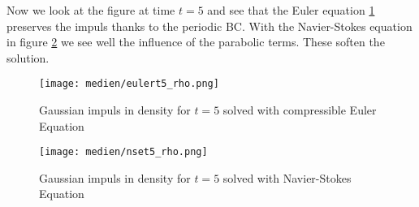 \documentclass[11pt]{scrartcl}
\begin{document}
 Now we look at the figure at time $t = 5$ and see that the Euler equation \ref{gaus_euler_t5} preserves the impuls thanks to the periodic BC. With the Navier-Stokes equation in figure \ref{gaus_nse_t5} we see well the influence of the parabolic terms. These soften the solution.
 
 \begin{figure}[H]
 	\centering
 	\texttt{[image: medien/eulert5\_rho.png]}
 	\caption{Gaussian impuls in density for $t=5$ solved with compressible Euler Equation}
 	\label{gaus_euler_t5}
 \end{figure}

 \begin{figure}[H]
	\centering
	\texttt{[image: medien/nset5\_rho.png]}
	\caption{Gaussian impuls in density for $t=5$ solved with Navier-Stokes Equation}
	\label{gaus_nse_t5}
\end{figure}




\newpage
{}


\end{document}
